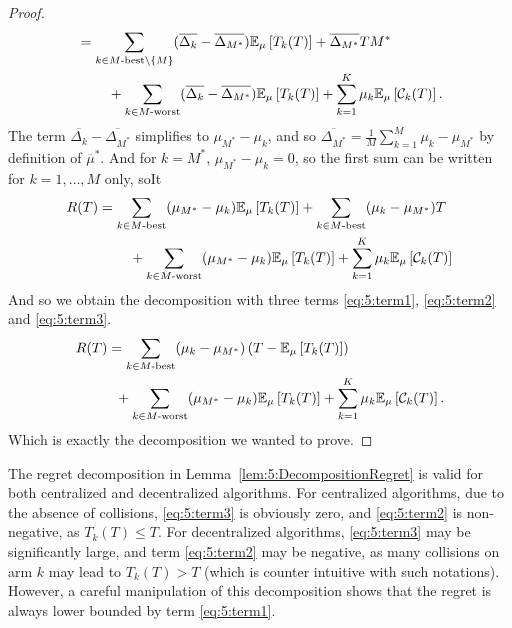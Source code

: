 \begin{proof}
\begin{align*}
    &= \sum_{k \in M\text{-}\mathrm{best}\setminus\{M\}} (\overline{\Delta_k} - \overline{\Delta_{M^*}}) \mathbb{E}_{\mu}\left[ T_k(T) \right]
      + \overline{\Delta_{M^*}} T M^* \\
      &\;\;\;\;\;\;\;\; + \sum_{k \in M\text{-}\mathrm{worst}} (\overline{\Delta_k} - \overline{\Delta_{M^*}}) \mathbb{E}_{\mu}\left[ T_k(T) \right]
      + \sum_{k=1}^{K} \mu_k \mathbb{E}_{\mu}\left[ \mathcal{C}_k(T) \right].
  \end{align*}
  The term $\overline{\Delta_k} - \overline{\Delta_{M^*}}$ simplifies to $\mu_{M^*} - \mu_k$, and so $\overline{\Delta_{M^*}} = \frac{1}{M} \sum_{k=1}^{M} \mu_k - \mu_{M^*}$ by definition of $\overline{\mu}^*$. And for $k=M^*$, $\mu_{M^*} - \mu_k = 0$, so the first sum can be written for $k = 1,\dots,M$ only, soIt
  \begin{align*}
    R(T)
    &= \sum_{k \in M\text{-}\mathrm{best}} (\mu_{M^*} - \mu_k) \mathbb{E}_{\mu}\left[ T_k(T) \right]
      + \sum_{k \in M\text{-}\mathrm{best}} (\mu_k - \mu_{M^*}) T \\
      &\;\;\;\;\;\;\;\; + \sum_{k \in M\text{-}\mathrm{worst}} (\mu_{M^*} - \mu_k) \mathbb{E}_{\mu}\left[ T_k(T) \right]
      + \sum_{k=1}^{K} \mu_k \mathbb{E}_{\mu}\left[ \mathcal{C}_k(T) \right]
  \end{align*}
  And so we obtain the decomposition with three terms \ref{eq:5:term1}, \ref{eq:5:term2} and \ref{eq:5:term3}.
  \begin{align*}
  R(T)
    & = \sum_{k \in M\text{-}\mathrm{best}} (\mu_k - \mu_{M^*}) \left(T - \mathbb{E}_{\mu}\left[ T_k(T) \right]\right) \\
      & \;\; + \sum_{k \in M\text{-}\mathrm{worst}} (\mu_{M^*} - \mu_k) \mathbb{E}_{\mu}\left[ T_k(T) \right]
      + \sum_{k=1}^{K} \mu_k \mathbb{E}_{\mu}\left[ \mathcal{C}_k(T) \right].
  \end{align*}
  Which is exactly the decomposition we wanted to prove.
\end{proof}


The regret decomposition in Lemma~\ref{lem:5:DecompositionRegret} is valid for both centralized and decentralized algorithms.
For centralized algorithms, due to the absence of collisions, \ref{eq:5:term3} is obviously zero, and \ref{eq:5:term2} is non-negative, as $T_k(T) \leq T$. For decentralized algorithms, \ref{eq:5:term3} may be significantly large, and term \ref{eq:5:term2} may be negative, as many collisions on arm $k$ may lead to $T_k(T) > T$ (which is counter intuitive with such notations).
However, a careful manipulation of this decomposition shows that the regret is always lower bounded by term \ref{eq:5:term1}.

